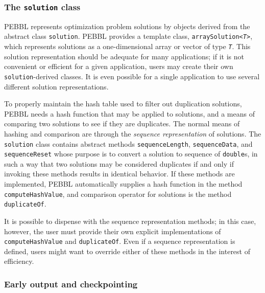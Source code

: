 \subsubsection{The \texttt{solution} class}
\label{sec:solclass}
PEBBL represents optimization problem solutions by objects derived
from the abstract class \texttt{solution}.  PEBBL provides a template
class, \texttt{arraySolution<\emph{T}>}, which represents solutions as a
one-dimensional array or vector of type \texttt{\emph{T}}.  This solution
representation should be adequate for many applications; if it is not
convenient or efficient for a given application, users may create
their own \texttt{solution}-derived classes.  It is even possible for
a single application to use several different solution
representations.

To properly maintain the hash table used to filter out duplication
solutions, PEBBL needs a hash function that may be applied to
solutions, and a means of comparing two solutions to see if they are
duplicates.  The normal means of hashing and comparison are through
the \emph{sequence representation} of solutions.  The
\texttt{solution} class contains abstract methods
\texttt{sequenceLength}, \texttt{sequenceData}, and
\texttt{sequenceReset} whose purpose is to convert a solution to
sequence of \texttt{double}s, in such a way that two solutions may be
considered duplicates if and only if invoking these methods results in identical
behavior.  If these methods are implemented, PEBBL automatically
supplies a hash function in the method \texttt{computeHashValue}, and
comparison operator for solutions is the method \texttt{duplicateOf}.

It is possible to dispense with the sequence representation methods;
in this case, however, the user must provide their own explicit
implementations of \texttt{computeHashValue} and
\texttt{duplicateOf}.  Even if a sequence representation is defined,
users might want to override either of these methods in the interest
of efficiency.


\subsubsection{Early output and checkpointing}


